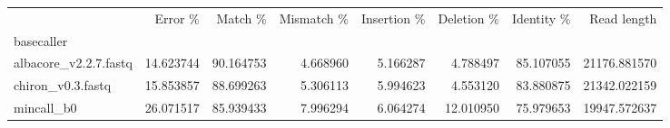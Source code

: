 \begin{tabular}{lrrrrrrr}
\toprule
{} &    Error \% &    Match \% &  Mismatch \% &  Insertion \% &  Deletion \% &  Identity \% &   Read length \\
basecaller            &            &            &             &              &             &             &               \\
\midrule
albacore\_v2.2.7.fastq &  14.623744 &  90.164753 &    4.668960 &     5.166287 &    4.788497 &   85.107055 &  21176.881570 \\
chiron\_v0.3.fastq     &  15.853857 &  88.699263 &    5.306113 &     5.994623 &    4.553120 &   83.880875 &  21342.022159 \\
mincall\_b0            &  26.071517 &  85.939433 &    7.996294 &     6.064274 &   12.010950 &   75.979653 &  19947.572637 \\
\bottomrule
\end{tabular}
